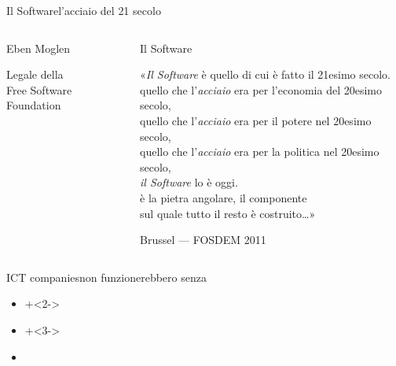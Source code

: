 \documentclass[italian,compress,red]{beamer}
\begin{document}
\begin{frame}{Il Software}{l'acciaio del {21\textdegree} secolo}
  \begin{columns}[T]
  \begin{column}{.3\textwidth}
    \begin{block}{Eben Moglen}
      \begin{center}
      \end{center}
      \vfill
      \begin{tiny}Legale della \\ Free Software Foundation\end{tiny}\\
    \end{block}

  \end{column} 
  \begin{column}{.7\textwidth}
    \begin{exampleblock}{Il Software}
      \begin{scriptsize}

    «\emph{Il Software} è quello di cui è fatto il 21esimo secolo. \\
    quello che l'\emph{acciaio} era per l'economia del 20esimo secolo, \\
    quello che l'\emph{acciaio} era per il potere nel 20esimo secolo, \\
    quello che l'\emph{acciaio} era per la politica nel 20esimo secolo, \\
    \emph{il Software} lo è oggi. \\
    è la pietra angolare, il componente \\ 
    sul quale tutto il resto è costruito\ldots» \\
      \end{scriptsize}
      \vfill
      \begin{tiny} Brussel --- FOSDEM 2011 \end{tiny}
      
    \end{exampleblock}   
  \end{column}
  \end{columns}

\end{frame}

\begin{frame}{ICT companies}{non funzionerebbero senza}
\begin{itemize}
  \onslide+<1-> \item {}
  \onslide+<2-> \item {}
  \onslide+<3-> \item {}
 \end{itemize}

\end{frame}
\end{document}
